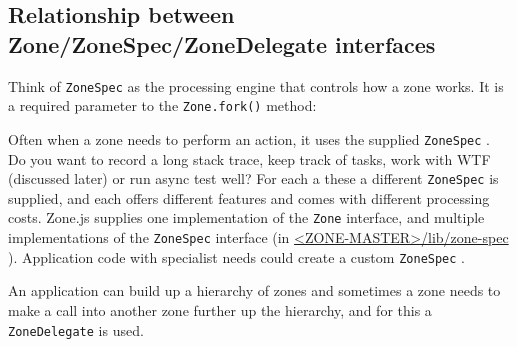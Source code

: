 \subsection{Relationship between Zone/ZoneSpec/ZoneDelegate interfaces}

Think of
\texttt{ZoneSpec}
as the processing engine that controls how a zone works. It is a
required parameter to the
\texttt{Zone.fork()}
method:



Often when a zone needs to perform an action, it uses the supplied
\texttt{ZoneSpec}
. Do you
want to record a long stack trace, keep track of tasks, work with WTF (discussed
later) or run async test well? For each a these a different
\texttt{ZoneSpec}
is supplied, and
each offers different features and comes with different processing costs. Zone.js
supplies one implementation of the
\texttt{Zone}
interface, and multiple implementations of
the
\texttt{ZoneSpec}
interface (in
\href{https://github.com/angular/zone.js/tree/master/lib/zone-spec}
{<ZONE-MASTER>/lib/zone-spec}
). Application code with
specialist needs could create a custom
\texttt{ZoneSpec}
.

An application can build up a hierarchy of zones and sometimes a zone needs to make
a call into another zone further up the hierarchy, and for this a
\texttt{ZoneDelegate}
is used.
